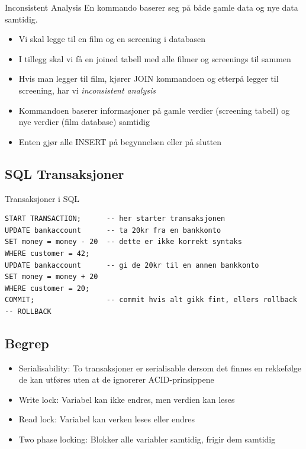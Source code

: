 \begin{frame}{}
    \begin{block}{Inconsistent Analysis}
    En kommando baserer seg på både gamle data og nye data samtidig.
    \end{block}
    \begin{itemize}
        \item Vi skal legge til en film og en screening i databasen
        \item I tillegg skal vi få en joined tabell med alle filmer og screenings til sammen
        \item Hvis man legger til film, kjører JOIN kommandoen og etterpå legger til screening, har vi \textit{inconsistent analysis}
        \item Kommandoen baserer informasjoner på gamle verdier (screening tabell) og nye verdier (film database) samtidig
        \item Enten gjør alle INSERT på begynnelsen eller på slutten
    \end{itemize}
\end{frame}

\subsection*{SQL Transaksjoner}
\begin{frame}[fragile]{Transaksjoner i SQL}
\begin{verbatim}
START TRANSACTION;      -- her starter transaksjonen
UPDATE bankaccount      -- ta 20kr fra en bankkonto 
SET money = money - 20  -- dette er ikke korrekt syntaks
WHERE customer = 42;
UPDATE bankaccount      -- gi de 20kr til en annen bankkonto
SET money = money + 20
WHERE customer = 20;
COMMIT;                 -- commit hvis alt gikk fint, ellers rollback
-- ROLLBACK
\end{verbatim}
\end{frame}

\subsection*{Begrep}
\begin{frame}
\begin{itemize}
    \item Serialisability: To transaksjoner er serialisable dersom det finnes en rekkefølge de kan utføres uten at de ignorerer ACID-prinsippene
    \item Write lock: Variabel kan ikke endres, men verdien kan leses 
    \item Read lock: Variabel kan verken leses eller endres
    \item Two phase locking: Blokker alle variabler samtidig, frigir dem samtidig
\end{itemize}
\end{frame}

